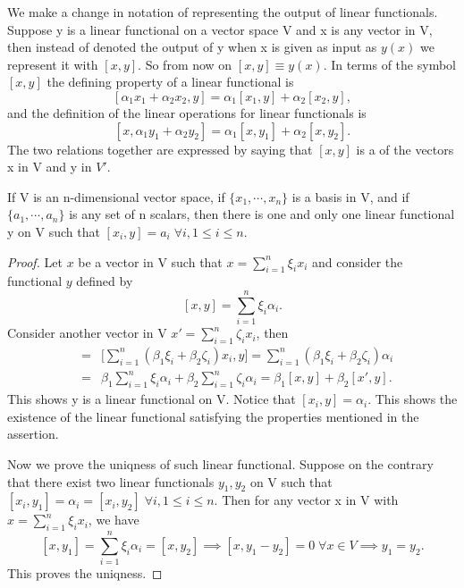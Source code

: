 \documentclass[10pt,a4paper]{article}
\begin{document}
\begin{note}\label{note:notation_linear_functional}
    We make a change in notation of representing the output of linear functionals. Suppose y is a linear functional on a vector space V and x is any vector in V, then instead of denoted the output of y when x is given as input as $y(x)$ we represent it with $[x,y]$. So from now on $[x,y]\equiv y(x)$. In terms of the symbol $[x, y]$ the defining property of a linear functional is 
    \begin{equation}\label{eqn:linear_functional_def}
        [\alpha_1x_1+\alpha_2x_2,y]=\alpha_1[x_1,y]+\alpha_2[x_2,y],
    \end{equation}
    and the definition of the linear operations for linear functionals is 
    \begin{equation}\label{eqn:linear_functional_prop}
        [x,\alpha_1y_1+\alpha_2y_2]=\alpha_1[x,y_1]+\alpha_2[x,y_2].
    \end{equation}
    The two relations together are expressed by saying that $[x, y]$ is a   of the vectors x in V and y in $V'$.
\end{note}


\begin{lemma}\label{lemma:dual_basis}
    If V is an n-dimensional vector space, if $\{x_1,\cdots, x_n\}$ is a basis in V, and if $\{a_1, \cdots, a_n\}$ is any set of n scalars, then there is one and only one linear functional y on V such that $[x_i, y] = a_i\;\forall i,1\le i\le n$.
\end{lemma}

\begin{proof}
    Let $x$ be a vector in V such that $x=\sum_{i=1}^n\xi_ix_i$ and consider the functional $y$ defined by 
    $$
        [x,y]=\sum_{i=1}^n\xi_i\alpha_i.
    $$
    Consider another vector in V $x'=\sum_{i=1}^n\zeta_ix_i$, then 
    \begin{eqnarray*}
        [\beta_1x+\beta_2x',y] &=& \Bigg[\sum_{i=1}^n(\beta_1\xi_i+\beta_2\zeta_i)x_i,y\Bigg] = \sum_{i=1}^n(\beta_1\xi_i+\beta_2\zeta_i)\alpha_i \\
        &=& \beta_1\sum_{i=1}^n\xi_i\alpha_i+\beta_2\sum_{i=1}^n\zeta_i\alpha_i = \beta_1[x,y]+\beta_2[x',y].
    \end{eqnarray*}
    This shows y is a linear functional on V. Notice that $[x_i,y]=\alpha_i$. This shows the existence of the linear functional satisfying the properties mentioned in the assertion. 

    Now we prove the uniqness of such linear functional. Suppose on the contrary that there exist two linear functionals $y_1, y_2$ on V such that $[x_i,y_1] = \alpha_i = [x_i,y_2]\;\forall i, 1\le i\le n$. Then for any vector x in V with $x=\sum_{i=1}^n\xi_ix_i$, we have 
    $$
        [x,y_1] = \sum_{i=1}^n\xi_i\alpha_i = [x,y_2] \implies [x,y_1-y_2] = 0\;\forall x\in V\implies y_1=y_2.
    $$
    This proves the uniqness.
\end{proof}
\end{document}
